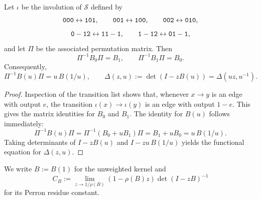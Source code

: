 \begin{proposition}\label{prop:sync-self-duality}
Let \(\iota\) be the involution of \(\mathcal S\) defined by
\[
  \mathtt{000}\leftrightarrow\mathtt{101},\qquad
  \mathtt{001}\leftrightarrow\mathtt{100},\qquad
  \mathtt{002}\leftrightarrow\mathtt{010},
\]
\[
  \mathtt{0-12}\leftrightarrow\mathtt{11-1},\qquad
  \mathtt{1-12}\leftrightarrow\mathtt{01-1},
\]
and let \(\Pi\) be the associated permutation matrix. Then
\[
  \Pi^{-1}B_0\Pi=B_1,
  \qquad
  \Pi^{-1}B_1\Pi=B_0.
\]
Consequently,
\[
  \Pi^{-1}B(u)\Pi=u\,B(1/u),
  \qquad
  \Delta(z,u):=\det(I-zB(u))=\Delta(uz,u^{-1}).
\]
\end{proposition}

\begin{proof}
Inspection of the transition list shows that, whenever
\(x\to y\) is an edge with output \(e\), the transition
\(\iota(x)\to\iota(y)\) is an edge with output \(1-e\). This gives the
matrix identities for \(B_0\) and \(B_1\). The identity for \(B(u)\)
follows immediately:
\[
  \Pi^{-1}B(u)\Pi
  =\Pi^{-1}(B_0+uB_1)\Pi
  =B_1+uB_0
  =u\,B(1/u).
\]
Taking determinants of \(I-zB(u)\) and \(I-zu\,B(1/u)\) yields the
functional equation for \(\Delta(z,u)\).
\end{proof}

\begin{definition}\label{def:perron-residue-constant}
We write \(B:=B(1)\) for the unweighted kernel and
\[
  C_B:=\lim_{z\to 1/\rho(B)}(1-\rho(B)z)\det(I-zB)^{-1}
\]
for its Perron residue constant.
\end{definition}




